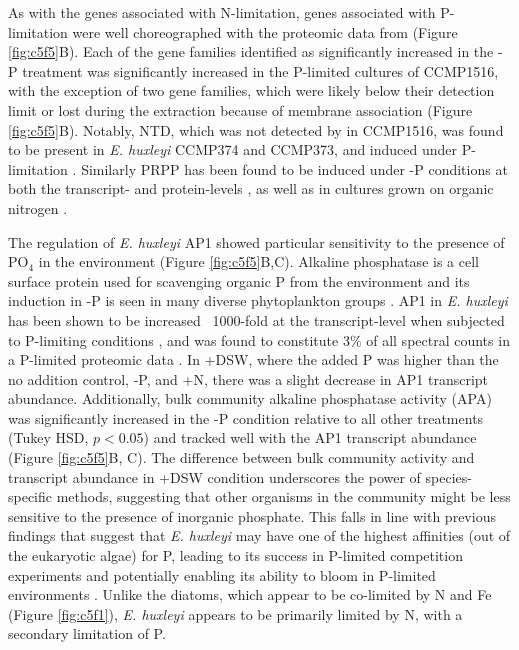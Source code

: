 As with the genes associated with N-limitation, genes associated with P-limitation were well choreographed with the proteomic data from \citet{McKew2015} (Figure \ref{fig:c5f5}B). Each of the gene families identified as significantly increased in the -P treatment was significantly increased in the P-limited cultures of CCMP1516, with the exception of two gene families, which were likely below their detection limit or lost during the extraction because of membrane association (Figure \ref{fig:c5f5}B). Notably, NTD, which was not detected by \citet{McKew2015} in CCMP1516, was found to be present in \textit{E. huxleyi} CCMP374 and CCMP373, and induced under P-limitation \citep{Dyhrman2003}. Similarly PRPP has been found to be induced under -P conditions at both the transcript- \citep{Dyhrman2006} and protein-levels \citep{McKew2015}, as well as in cultures grown on organic nitrogen \citep{Bruhn2010}. \par

The regulation of \textit{E. huxleyi} AP1 showed particular sensitivity to the presence of PO$_4$ in the environment (Figure \ref{fig:c5f5}B,C). Alkaline phosphatase is a cell surface protein used for scavenging organic P from the environment and its induction in -P is seen in many diverse phytoplankton groups \citep{Sakshaug1984, Dyhrman1997, Dyhrman2003, Wurch2011}. AP1 in \textit{E. huxleyi} has been shown to be increased ~1000-fold at the transcript-level when subjected to P-limiting conditions \citep{Xu2006}, and was found to constitute 3\% of all spectral counts in a P-limited proteomic data \citep{McKew2015}. In +DSW, where the added P was higher than the no addition control, -P, and +N, there was a slight decrease in AP1 transcript abundance. Additionally, bulk community alkaline phosphatase activity (APA) was significantly increased in the -P condition relative to all other treatments (Tukey HSD, $p < 0.05$) and tracked well with the AP1 transcript abundance (Figure \ref{fig:c5f5}B, C). The difference between bulk community activity and transcript abundance in +DSW condition underscores the power of species-specific methods, suggesting that other organisms in the community might be less sensitive to the presence of inorganic phosphate. This falls in line with previous findings that suggest that \textit{E. huxleyi} may have one of the highest affinities (out of the eukaryotic algae) for P, leading to its success in P-limited competition experiments \citep{Riegman2000} and potentially enabling its ability to bloom in P-limited environments \citep{Lessard2005}. Unlike the diatoms, which appear to be co-limited by N and Fe (Figure \ref{fig:c5f1}), \textit{E. huxleyi} appears to be primarily limited by N, with a secondary limitation of P. \par


